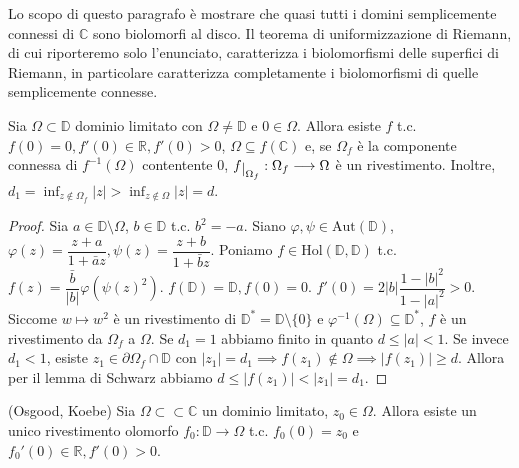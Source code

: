 Lo scopo di questo paragrafo è mostrare che quasi tutti i domini semplicemente connessi di $\mathbb{C}$ sono biolomorfi al disco. Il teorema di uniformizzazione di Riemann, di cui riporteremo solo l'enunciato, caratterizza i biolomorfismi delle superfici di Riemann, in particolare caratterizza completamente i biolomorfismi di quelle semplicemente connesse.

\begin{lm}
  Sia $\Omega \subset \mathbb{D}$ dominio limitato con $\Omega \not=\mathbb{D}$ e $0 \in \Omega$.
  Allora esiste $f$ t.c. $f(0)=0, f'(0) \in \mathbb{R}, f'(0)>0$, $\Omega \subseteq f(\mathbb{C})$ e, se $\Omega_f$ è la componente connessa di $f^{-1}(\Omega)$ contentente $0$, $f\restrict{\Omega_f}:\Omega_f \longrightarrow \Omega$ è un rivestimento.
  Inoltre, $\displaystyle d_1=\inf_{z \not\in \Omega_f} |z|>\inf_{z \not\in \Omega} |z|=d$.
\end{lm}

\begin{proof}
  Sia $a \in \mathbb{D}\setminus\Omega$, $b \in \mathbb{D}$ t.c. $b^2=-a$. Siano $\varphi, \psi \in \text{Aut}(\mathbb{D})$, $\varphi(z)=\dfrac{z+a}{1+\bar{a}z}, \psi(z)=\dfrac{z+b}{1+\bar{b}z}$.
  Poniamo $f \in \text{Hol}(\mathbb{D}, \mathbb{D})$ t.c. $f(z)=\dfrac{\bar{b}}{|b|}\varphi(\psi(z)^2)$. $f(\mathbb{D})=\mathbb{D}, f(0)=0$. $f'(0)=2|b|\dfrac{1-|b|^2}{1-|a|^2}>0$.
  Siccome $w \longmapsto w^2$ è un rivestimento di $\mathbb{D}^*=\mathbb{D}\setminus\{0\}$ e $\varphi^{-1}(\Omega) \subseteq \mathbb{D}^*$, $f$ è un rivestimento da $\Omega_f$ a $\Omega$. Se $d_1=1$ abbiamo finito in quanto $d \le |a|<1$.
  Se invece $d_1<1$, esiste $z_1 \in \partial\Omega_f \cap \mathbb{D}$ con $|z_1|=d_1 \implies f(z_1) \not\in \Omega \implies |f(z_1)| \ge d$. Allora per il lemma di Schwarz abbiamo $d \le |f(z_1)|<|z_1|=d_1$.
\end{proof}

\begin{thm}
  (Osgood, Koebe) Sia $\Omega \subset \subset \mathbb{C}$ un dominio limitato, $z_0 \in \Omega$. Allora esiste un unico rivestimento olomorfo $f_0:\mathbb{D} \longrightarrow \Omega$ t.c. $f_0(0)=z_0$ e $f_0'(0) \in \mathbb{R}, f'(0)>0$.
\end{thm}

